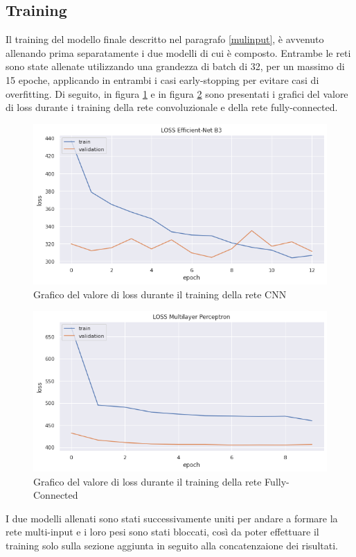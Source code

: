     \subsection{Training}
    Il training del modello finale descritto nel paragrafo \ref{mulinput}, è avvenuto allenando prima separatamente i due modelli di cui è composto. Entrambe le reti sono state 
    allenate utilizzando una grandezza di batch di 32, per un massimo di 15 epoche, applicando in entrambi i casi early-stopping per evitare casi di overfitting. Di seguito, 
    in figura \ref{fig:loss_cnn} e in figura \ref{fig:loss_mlp} sono presentati i grafici del valore di loss durante i training della rete convoluzionale e della rete fully-connected.
        \begin{figure}[H]
            \centering
            \includegraphics[scale=0.5]{Plot/loss-cnn.png}
            \caption{Grafico del valore di loss durante il training della rete CNN}
            \label{fig:loss_cnn}
        \end{figure}
        \begin{figure}[H]
            \centering
            \includegraphics[scale=0.5]{Plot/loss-mlp.png}
            \caption{Grafico del valore di loss durante il training della rete Fully-Connected}
            \label{fig:loss_mlp}
        \end{figure}
    I due modelli allenati sono stati successivamente uniti per andare a formare la rete multi-input e i loro pesi sono stati bloccati, così da poter effettuare il training 
    solo sulla sezione aggiunta in seguito alla concatenzaione dei risultati.

